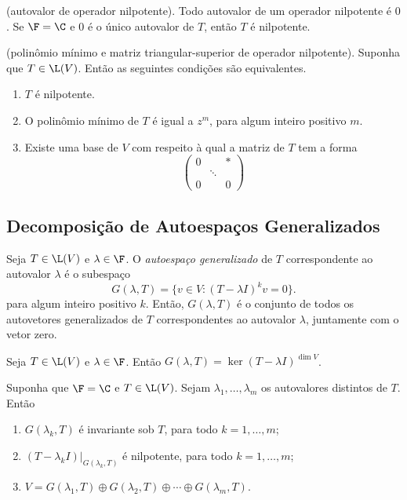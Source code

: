 \documentclass{article}
\begin{document}
\begin{prop} (autovalor de operador nilpotente).
    Todo autovalor de um operador nilpotente é \(0\). Se \(\F = \C\) e \(0\) é o único autovalor de \(T\), então \(T\) é nilpotente.
\end{prop}

\begin{prop} (polinômio mínimo e matriz triangular-superior de operador nilpotente).
    Suponha que \(T \in \L(V)\). Então as seguintes condições são equivalentes.
    \begin{enumerate}
        \item [(a)] \(T\) é nilpotente.
        \item [(b)] O polinômio mínimo de \(T\) é igual a \(z^m\), para algum inteiro positivo \(m\).
        \item [(c)] Existe uma base de \(V\) com respeito à qual a matriz de \(T\) tem a forma 
        \[
            \begin{pmatrix*}
                0 & & * \\
                & \ddots & \\
                0 & & 0
            \end{pmatrix*}
        \]
    \end{enumerate}
\end{prop}

\subsection{Decomposição de Autoespaços Generalizados}

\begin{defn}
    Seja \(T \in \L(V)\) e \(\lambda \in \F\). O \emph{autoespaço generalizado} de \(T\) correspondente ao autovalor \(\lambda\) é o subespaço
    \[
        G(\lambda, T) = \{v \in V : (T - \lambda I)^k v = 0\}.
    \]
    \noindent para algum inteiro positivo \(k\). Então, \(G(\lambda, T)\) é o conjunto de todos os autovetores generalizados de \(T\) correspondentes ao autovalor \(\lambda\), juntamente com o vetor zero.
\end{defn}

\begin{prop}
    Seja \(T \in \L(V)\) e \(\lambda \in \F\). Então \(G(\lambda, T) = \ker (T - \lambda I)^{\dim V}\).
\end{prop}

\begin{thm} 
    Suponha que \(\F = \C\) e \(T \in \L(V)\). Sejam \(\lambda_1, \ldots, \lambda_m\) os autovalores distintos de \(T\). Então
    \begin{enumerate}
        \item [(a)] \(G(\lambda_k, T)\) é invariante sob \(T\), para todo \(k = 1, \ldots, m\);
        \item [(b)] \((T - \lambda_k I)|_{G(\lambda_k, T)}\) é nilpotente, para todo \(k = 1, \ldots, m\);
        \item [(c)] \(V = G(\lambda_1, T) \oplus G(\lambda_2, T) \oplus \cdots \oplus G(\lambda_m, T)\).
    \end{enumerate}
\end{thm}
\end{document}
